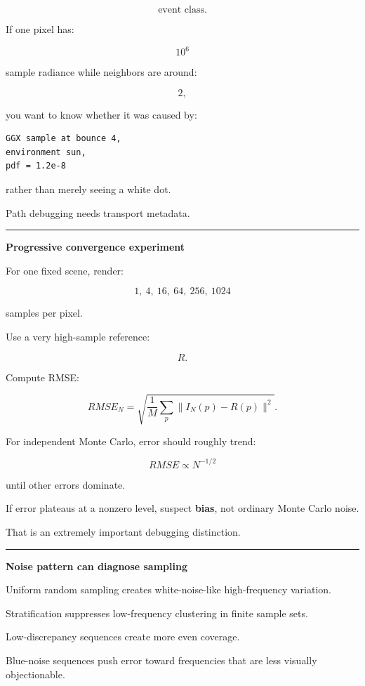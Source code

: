 \[
\text{event class}.
\]

If one pixel has:

\[
10^6
\]

sample radiance while neighbors are around:

\[
2,
\]

you want to know whether it was caused by:

\begin{verbatim}
GGX sample at bounce 4,
environment sun,
pdf = 1.2e-8
\end{verbatim}

rather than merely seeing a white dot.

Path debugging needs transport metadata.

\begin{center}\rule{0.5\linewidth}{0.5pt}\end{center}

\textbf{Progressive convergence experiment}

For one fixed scene, render:

\[
1,\ 4,\ 16,\ 64,\ 256,\ 1024
\]

samples per pixel.

Use a very high-sample reference:

\[
R.
\]

Compute RMSE:

\[
RMSE_N
=
\sqrt{
\frac1M
\sum_p
\|I_N(p)-R(p)\|^2
}.
\]

For independent Monte Carlo, error should roughly trend:

\[
\boxed{
RMSE\propto N^{-1/2}
}
\]

until other errors dominate.

If error plateaus at a nonzero level, suspect \textbf{bias}, not ordinary Monte Carlo noise.

That is an extremely important debugging distinction.

\begin{center}\rule{0.5\linewidth}{0.5pt}\end{center}

\textbf{Noise pattern can diagnose sampling}

Uniform random sampling creates white-noise-like high-frequency variation.

Stratification suppresses low-frequency clustering in finite sample sets.

Low-discrepancy sequences create more even coverage.

Blue-noise sequences push error toward frequencies that are less visually objectionable.

